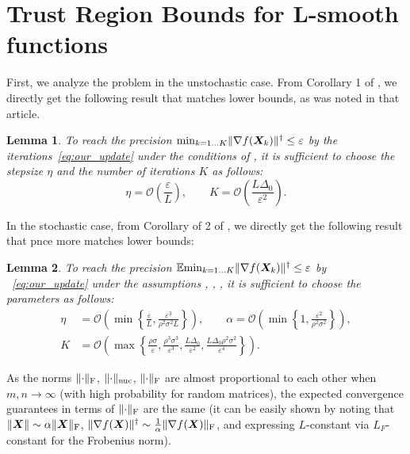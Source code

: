 \documentclass{article} %
\newtheorem{lemma}{Lemma}
\newcommand{\norm}[1]{\lVert #1\rVert}
\renewcommand{\epsilon}{\varepsilon}
\newcommand{\cO}{\mathcal{O}}
\DeclarePairedDelimiter{\normf}{\|}{\|_\mathrm{F}}
\DeclarePairedDelimiter{\normn}{\|}{\|_{\mathrm{nuc}}}
\begin{document}
\section{Trust Region Bounds for L-smooth functions}
    First, we analyze the problem in the unstochastic case. From Corollary 1 of \cite{kovalev2025understanding}, we directly get the following result that matches lower bounds, as was noted in that article.


    \begin{lemma}\label{lemma:no_noise_tr}
    To reach the precision $\min_{k=1\ldots K} \norm{\nabla f(\mX_k)}^\dagger \leq \epsilon$ by the iterations~\eqref{eq:our_update} under the conditions of , it is sufficient to choose the stepsize $\eta$ and the number of iterations $K$ as follows:
    \begin{equation}\label{eq:unstoch_tr}
      \eta = \cO\left(\frac{\epsilon}{L}\right),\qquad K = \cO\left(\frac{L\Delta_0}{\epsilon^2}\right).
    \end{equation}
    \end{lemma}

    In the stochastic case, from Corollary of 2 of \cite{kovalev2025understanding}, we directly get the following result that pnce more matches lower bounds:

    \begin{lemma}\label{lemma:stoch_tr}
    To reach the precision $\E{\min_{k=1\ldots K} \norm{\nabla f(\mX_k)}^\dagger} \leq \epsilon$ by ~\eqref{eq:our_update} under the assumptions , , , it is sufficient to choose the parameters as follows:
    \begin{align}
        \eta &= \cO\left(\min\left\{\frac{\epsilon}{L}, \frac{\epsilon^3}{\rho^2\sigma^2L}\right\}\right),
        \qquad
        \alpha = \cO\left(\min\left\{1, \frac{\epsilon^2}{\rho^2\sigma^2}\right\}\right),
        \\
        \label{eq:str_K_nonconvex}
        K &= \cO\left(\max\left\{
            \frac{\rho\sigma}{\epsilon},
            \frac{\rho^3\sigma^3}{\epsilon^3},
            \frac{L\Delta_0}{\epsilon^2},
            \frac{L\Delta_0\rho^2\sigma^2}{\epsilon^4}
        \right\}\right).
    \end{align}
    \end{lemma}

    As the norms $\normf{\cdot}$, $\normn{\cdot}$, $\normf{\cdot}$ are almost proportional to each other when $m, n \rightarrow \infty$ (with high probability for random matrices), the expected convergence guarantees in terms of $\normf{\cdot}$ are the same (it can be easily shown by noting that $\norm{\mX}\sim\alpha\normf{\mX}$, $\norm{\nabla f(\mX)}^\dagger \sim \frac{1}{\alpha} \normf{\nabla f(\mX)}$, and expressing $L$-constant via $L_F$-constant for the Frobenius norm).
\end{document}
